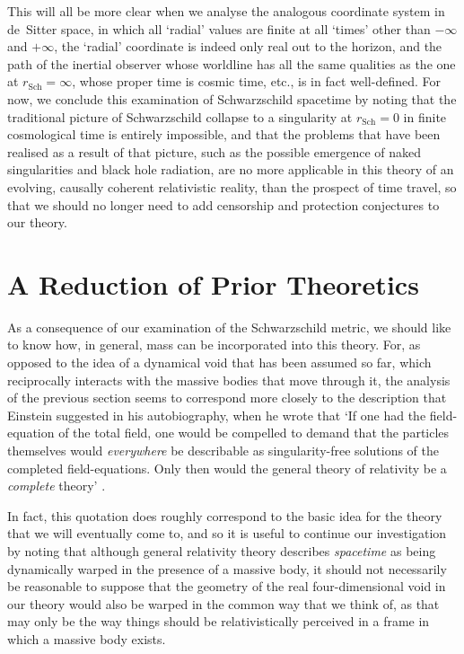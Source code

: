 This will all be more clear when we analyse the analogous coordinate system in de~Sitter space, in which all `radial' values are finite at all `times' other than $-\infty$ and $+\infty$, the `radial' coordinate is indeed only real out to the horizon, and the path of the inertial observer whose worldline has all the same qualities as the one at $r_{\mathrm{Sch}}=\infty$, whose proper time is cosmic time, etc., is in fact well-defined. For now, we conclude this examination of Schwarzschild spacetime by noting that the traditional picture of Schwarzschild collapse to a singularity at $r_{\mathrm{Sch}}=0$ in finite cosmological time is entirely impossible, and that the problems that have been realised as a result of that picture, such as the possible emergence of naked singularities and black hole radiation, are no more applicable in this theory of an evolving, causally coherent relativistic reality, than the prospect of time travel, so that we should no longer need to add censorship and protection conjectures to our theory.

\section{A Reduction of Prior Theoretics\label{sec_RPT}}
As a consequence of our examination of the Schwarzschild metric, we should like to know how, in general, mass can be incorporated into this theory. For, as opposed to the idea of a dynamical void that has been assumed so far, which reciprocally interacts with the massive bodies that move through it, the analysis of the previous section seems to correspond more closely to the description that Einstein suggested in his autobiography, when he wrote that `If one had the field-equation of the total field, one would be compelled to demand that the particles themselves would \textit{everywhere} be describable as singularity-free solutions of the completed field-equations. Only then would the general theory of relativity be a \textit{complete} theory' \cite{Einstein1951}.

In fact, this quotation does roughly correspond to the basic idea for the theory that we will eventually come to, and so it is useful to continue our investigation by noting that although general relativity theory describes \textit{spacetime} as being dynamically warped in the presence of a massive body, it should not necessarily be reasonable to suppose that the geometry of the real four-dimensional void in our theory would also be warped in the common way that we think of, as that may only be the way things should be relativistically perceived in a frame in which a massive body exists. 

